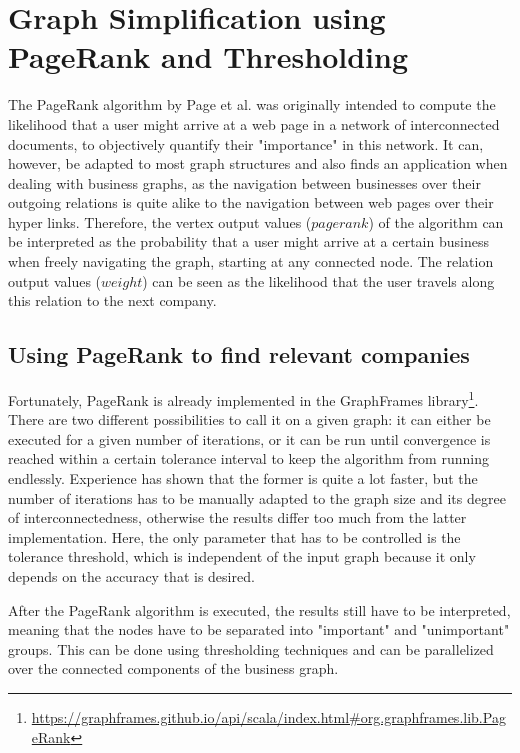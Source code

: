 \documentclass[
        a4paper,     %
        titlepage,   %
        oneside,     %
        parskip      %
        ]{scrartcl}  %
\begin{document}
  \section{Graph Simplification using PageRank and Thresholding}
  The PageRank algorithm by Page et al. \cite{pagerank1999} was originally intended
  to compute the likelihood that a user might arrive at a web page
  in a network of interconnected documents, to objectively quantify their "importance" in this network.
  It can, however, be adapted to most
  graph structures and also finds an application when dealing with business graphs,
  as the navigation between businesses over their outgoing relations is quite
  alike to the navigation between web pages over their hyper links.
  Therefore, the vertex output values ($pagerank$) of the algorithm can be interpreted as the
  probability that a user might arrive at a certain business when freely
  navigating the graph, starting at any connected node.
  The relation output values ($weight$) can be seen as the likelihood that the user
  travels along this relation to the next company.

  \subsection{Using PageRank to find relevant companies}
  Fortunately, PageRank is already implemented in the GraphFrames
  library\footnote{\url{https://graphframes.github.io/api/scala/index.html\#org.graphframes.lib.PageRank}}.
  There are two different possibilities to call it on a given graph: it can either
  be executed for a given number of iterations, or it can be run until convergence
  is reached within a certain tolerance interval to keep the algorithm from running endlessly.
  Experience has shown that the former is quite a lot faster, but the number of iterations
  has to be manually adapted to the graph size and its degree of interconnectedness,
  otherwise the results differ too much from the latter implementation.
  Here, the only parameter that has to be controlled is the tolerance threshold,
  which is independent of the input graph because it only depends on the accuracy that is desired.

  After the PageRank algorithm is executed, the results still have to be interpreted,
  meaning that the nodes have to be separated into "important" and "unimportant" groups.
  This can be done using thresholding techniques and can be parallelized
  over the connected components of the business graph.
\end{document}

